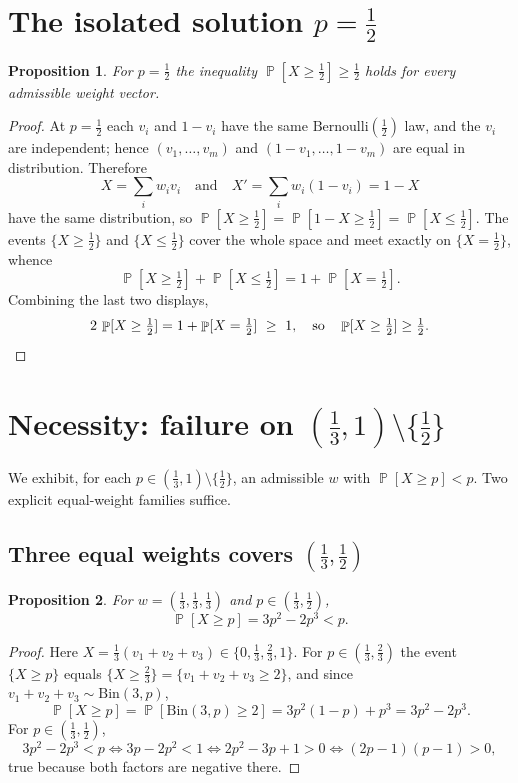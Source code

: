 \documentclass[11pt]{article}
\newtheorem{proposition}{Proposition}
\theoremstyle{definition}
\DeclareMathOperator{\PP}{\mathbb{P}}
\begin{document}
\section{The isolated solution \texorpdfstring{$p=\tfrac12$}{p=1/2}}

\begin{proposition}\label{prop:half}
For $p=\tfrac12$ the inequality $\PP[X\ge\tfrac12]\ge\tfrac12$ holds for every
admissible weight vector.
\end{proposition}

\begin{proof}
At $p=\tfrac12$ each $v_i$ and $1-v_i$ have the same $\mathrm{Bernoulli}(\tfrac12)$
law, and the $v_i$ are independent; hence $(v_1,\dots,v_m)$ and
$(1-v_1,\dots,1-v_m)$ are equal in distribution. Therefore
\[
X=\sum_i w_i v_i\quad\text{and}\quad X'=\sum_i w_i(1-v_i)=1-X
\]
have the same distribution, so $\PP[X\ge\tfrac12]=\PP[1-X\ge\tfrac12]
=\PP[X\le\tfrac12]$. The events $\{X\ge\tfrac12\}$ and $\{X\le\tfrac12\}$ cover
the whole space and meet exactly on $\{X=\tfrac12\}$, whence
\[
\PP[X\ge\tfrac12]+\PP[X\le\tfrac12]=1+\PP[X=\tfrac12].
\]
Combining the last two displays,
\[
2\,\PP[X\ge\tfrac12]=1+\PP[X=\tfrac12]\ \ge\ 1,
\quad\text{so}\quad \PP[X\ge\tfrac12]\ge\tfrac12. \qedhere
\]
\end{proof}

\section{Necessity: failure on \texorpdfstring{$(\tfrac13,1)\setminus\{\tfrac12\}$}{(1/3,1) minus 1/2}}
\label{sec:neg}

We exhibit, for each $p\in(\tfrac13,1)\setminus\{\tfrac12\}$, an admissible $w$
with $\PP[X\ge p]<p$. Two explicit equal-weight families suffice.

\subsection{Three equal weights covers \texorpdfstring{$(\tfrac13,\tfrac12)$}{(1/3,1/2)}}

\begin{proposition}\label{prop:three}
For $w=(\tfrac13,\tfrac13,\tfrac13)$ and $p\in(\tfrac13,\tfrac12)$,
\[
\PP[X\ge p]=3p^2-2p^3<p.
\]
\end{proposition}

\begin{proof}
Here $X=\tfrac13(v_1+v_2+v_3)\in\{0,\tfrac13,\tfrac23,1\}$. For
$p\in(\tfrac13,\tfrac23)$ the event $\{X\ge p\}$ equals $\{X\ge\tfrac23\}
=\{v_1+v_2+v_3\ge 2\}$, and since $v_1+v_2+v_3\sim\mathrm{Bin}(3,p)$,
\[
\PP[X\ge p]=\PP[\mathrm{Bin}(3,p)\ge2]=3p^2(1-p)+p^3=3p^2-2p^3.
\]
For $p\in(\tfrac13,\tfrac12)$,
\[
3p^2-2p^3<p\iff 3p-2p^2<1\iff 2p^2-3p+1>0\iff(2p-1)(p-1)>0,
\]
true because both factors are negative there.
\end{proof}
\end{document}
